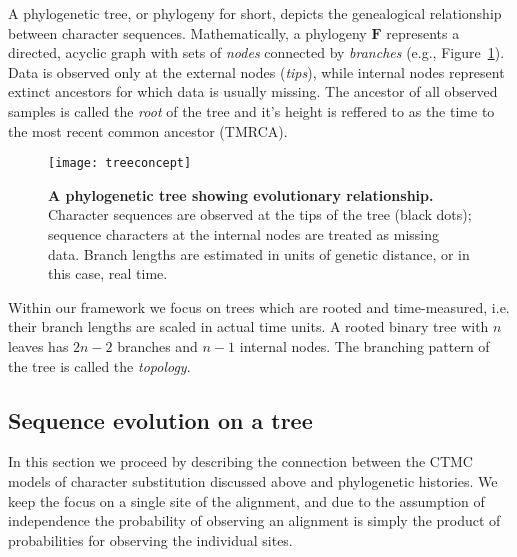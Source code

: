 A phylogenetic tree, or phylogeny for short, depicts the genealogical relationship between character sequences.
Mathematically, a phylogeny $\mathbf{F}$ represents a directed, acyclic graph with sets of \emph{nodes} connected by \emph{branches} (e.g., Figure~\ref{fig:treeconcept}).
Data is observed only at the external nodes (\emph{tips}), while internal nodes represent extinct ancestors for which data is usually missing.
The ancestor of all observed samples is called the \emph{root} of the tree and it's height is reffered to as the time to the most recent common ancestor (TMRCA).

\begin{figure}[H]
\centering
\texttt{[image: treeconcept]} 
\caption{
{ \footnotesize 
{\bf A phylogenetic tree showing evolutionary relationship.} Character sequences are observed at the tips of the tree (black dots); sequence characters at the internal nodes are treated as missing data. 
Branch lengths are estimated in units of genetic distance, or in this case, real time.
} %
}
\label{fig:treeconcept}
\end{figure}

Within our framework we focus on trees which are rooted and time-measured, i.e. their branch lengths are scaled in actual time units.
A rooted binary tree with $n$ leaves has $2n-2$ branches and $n-1$ internal nodes.
The branching pattern of the tree is called the \emph{topology}. 

\subsection{Sequence evolution on a tree\label{sub:evolutionOnTree}}

In this section we proceed by describing the connection between the CTMC models of character substitution discussed above and phylogenetic histories.
We keep the focus on a single site of the alignment, and due to the assumption of independence the probability of observing an alignment is simply the product of probabilities for observing the individual sites.

